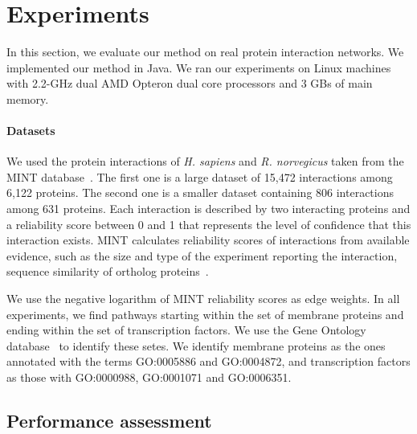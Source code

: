 \documentclass{ws-procs11x85}
\begin{document}
%


\section{Experiments}
\label{sec:exp}

In this section, we evaluate our method on real protein interaction
networks. We implemented our method in Java. We ran our experiments on
Linux machines with 2.2-GHz dual AMD Opteron dual core processors and
3 GBs of main memory.

\paragraph{Datasets}
We used the protein interactions of {\it H. sapiens} and {\it R.
  norvegicus} taken from the MINT database~\cite{mint1}. The first one
is a large dataset of 15,472 interactions among 6,122 proteins. The
second one is a smaller dataset containing 806 interactions among 631
proteins. Each interaction is described by two interacting proteins
and a reliability score between 0 and 1 that represents the level of
confidence that this interaction exists.  MINT calculates reliability
scores of interactions from available evidence, such as the size and
type of the experiment reporting the interaction, sequence similarity
of ortholog proteins~\cite{mint2}.

We use the negative logarithm of MINT reliability scores as edge
weights. In all experiments, we find pathways starting within the set
of membrane proteins and ending within the set of transcription
factors. We use the Gene Ontology database~\cite{go} to identify these
setes. We identify membrane proteins as the ones annotated with the
terms GO:0005886 and GO:0004872, and transcription factors as those
with GO:0000988, GO:0001071 and GO:0006351.

\subsection{Performance assessment}
\end{document}
